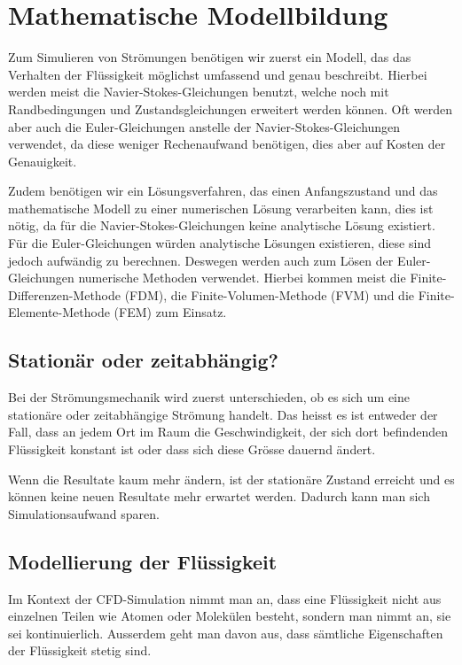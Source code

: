 %
%
%
%
\section{Mathematische Modellbildung
\label{openfoam:section:teil1}}
%
Zum Simulieren von Strömungen benötigen wir zuerst ein Modell, das das Verhalten der Flüssigkeit möglichst umfassend und genau beschreibt. 
Hierbei werden meist die Navier-Stokes-Gleichungen benutzt, welche noch mit Randbedingungen und Zustandsgleichungen erweitert werden können. 
Oft werden aber auch die Euler-Gleichungen anstelle der Navier-Stokes-Gleichungen verwendet, da diese weniger Rechenaufwand benötigen,
%
dies aber auf Kosten der Genauigkeit.

Zudem benötigen wir ein Lösungsverfahren, das einen Anfangszustand und das mathematische Modell zu einer numerischen Lösung verarbeiten kann, dies ist nötig, da für die Navier-Stokes-Gleichungen keine analytische Lösung existiert.
Für die Euler-Gleichungen würden analytische Lösungen existieren, diese sind jedoch aufwändig zu berechnen.
%
Deswegen werden auch zum Lösen der Euler-Gleichungen numerische Methoden verwendet.
Hierbei kommen meist die Finite-Differenzen-Methode (FDM), die Finite-Volumen-Methode (FVM) und die Finite-Elemente-Methode (FEM) zum Einsatz. 
%
%
%
%
%
%

\subsection{Stationär oder zeitabhängig?}
Bei der Strömungsmechanik wird zuerst unterschieden, ob es sich um eine stationäre oder zeitabhängige Strömung handelt.
%
%
Das heisst es ist entweder der Fall, dass an jedem Ort im Raum die Geschwindigkeit, der sich dort befindenden Flüssigkeit  konstant ist oder dass sich diese Grösse dauernd ändert.

Wenn die Resultate kaum mehr ändern, ist der stationäre Zustand erreicht und es können keine neuen Resultate mehr erwartet werden.
Dadurch kann man sich Simulationsaufwand sparen.

\subsection{Modellierung der Flüssigkeit}
Im Kontext der CFD-Simulation nimmt man an, dass eine Flüssigkeit nicht aus einzelnen Teilen wie Atomen oder Molekülen besteht, sondern man nimmt an, sie sei kontinuierlich. 
Ausserdem geht man davon aus, dass sämtliche Eigenschaften der Flüssigkeit stetig sind. 

